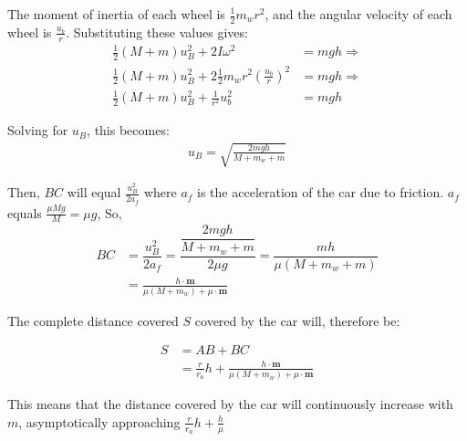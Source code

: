 \documentclass[titlepage,12pt]{article}
\begin{document}
        The moment of inertia of each wheel is $\frac{1}{2}m_wr^2$, and the angular velocity
        of each wheel is $\frac{u_b}{r}$. Substituting these values gives:
        \begin{align*}
            \frac{1}{2}(M+m)u_B^2 + 2I\omega^2                          &= mgh \Rightarrow \\
            \frac{1}{2}(M+m)u_B^2 + 2\frac{1}{2}m_wr^2(\frac{u_b}{r})^2 &= mgh \Rightarrow \\
            \frac{1}{2}(M+m)u_B^2 + \frac{1}{r^2}u_b^2 &= mgh
        \end{align*}

        Solving for $u_B$, this becomes:
        \begin{align*}
            u_B = \sqrt{\frac{2mgh}{M+m_w+m}}
        \end{align*}

        Then, $BC$ will equal $\frac{u_B^2}{2a_f}$ where $a_f$ is the acceleration of the
        car due to friction. $a_f$ equals $\frac{\mu M g}{M} = \mu g$, So, 
        \begin{align*}
            BC &= \dfrac{u_B^2}{2a_f} = \dfrac{\dfrac{2mgh}{M+m_w+m}}{2\mu g}
                                     = \dfrac{mh}{\mu(M+m_w+m)} \\
               &= \frac{h\cdot \mathbf{m}}{\mu(M+m_w) + \mu \cdot \textbf{m}}
        \end{align*}

        The complete distance covered $S$ covered by the car will, therefore be:
        \begin{framed}
            \begin{equation} \label{eq:s_formula}
            \begin{aligned}
                S &= AB + BC \\
                   &= \frac{r}{r_a}h + \frac{h\cdot \mathbf{m}}{\mu(M+m_w) + \mu \cdot \textbf{m}}
            \end{aligned}
            \end{equation}
        \end{framed}
        This means that the distance covered by the car will continuously increase with $m$,
        asymptotically approaching $\frac{r}{r_a}h + \frac{h}{\mu}$
        
        
\end{document}
